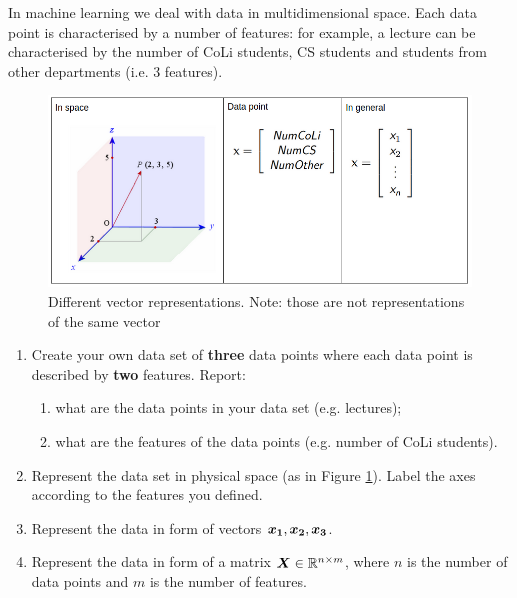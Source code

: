 \begin{exercise}

In machine learning we deal with data in multidimensional space.
Each data point is characterised by a number of features: for example, a lecture can be characterised by the number of CoLi students, CS students and students from other departments (i.e. 3 features).

\begin{figure}[h]
    \centering
    \includegraphics[width=.8\textwidth]{figures/vectors.png}
    \caption{Different vector representations. Note: those are not representations of the same vector}
    \label{fig:vector_representations}
\end{figure}

\begin{enumerate}
\item Create your own data set of \textbf{three} data points where each data point is described by \textbf{two} features.
Report:
    \begin{enumerate}
        \item what are the data points in your data set (e.g. lectures);
        \item what are the features of the data points (e.g. number of CoLi students).
    \end{enumerate}

\item Represent the data set in physical space (as in Figure \ref{fig:vector_representations}).
Label the axes according to the features you defined.

\item Represent the data in form of vectors $\boldsymbol{x_1}, \boldsymbol{x_2}, \boldsymbol{x_3}$.

\item Represent the data in form of a matrix $\boldsymbol{X} \in \mathbb{R}^{n\times m}$, where $n$ is the number of data points and $m$ is the number of features.

\end{enumerate}

\end{exercise}

